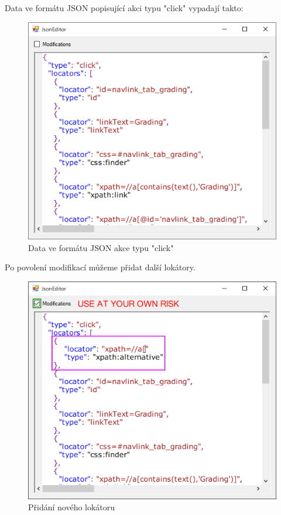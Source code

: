\documentclass[12pt, a4paper, twoside]{article}
\begin{document}
	Data ve formátu JSON popisující akci typu "click" vypadají takto:
	\begin{figure}[H]
		\centering
		\includegraphics[width=1.0\textwidth]{clickActionJson.png}
		\caption{Data ve formátu JSON akce typu "click"}
	\end{figure}
	Po povolení modifikací můžeme přidat další lokátory.
	\nopagebreak
	\begin{figure}[H]
		\centering
		\includegraphics[width=1.0\textwidth]{customLocatorJSON.png}
		\caption{Přidání nového lokátoru}
	\end{figure}
	\newpage
\end{document}

